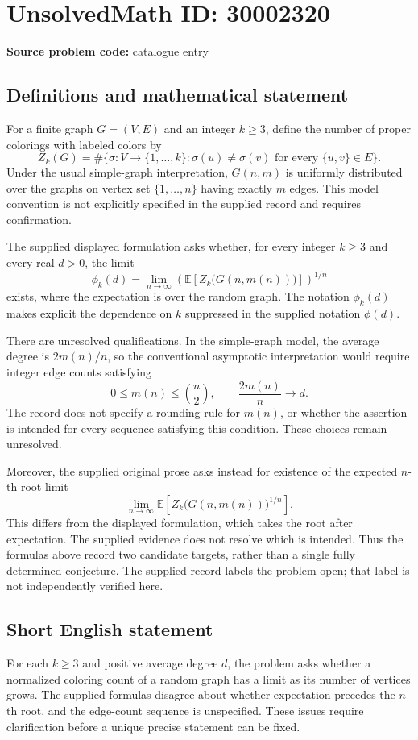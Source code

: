\documentclass[11pt]{article}
\begin{document}
\section*{UnsolvedMath ID: 30002320}
\textbf{Source problem code:} catalogue entry
\subsection{Definitions and mathematical statement}
For a finite graph \(G=(V,E)\) and an integer \(k\geq 3\), define the number of proper colorings with labeled colors by
\[
Z_k(G)=\#\bigl\{\sigma:V\to\{1,\ldots,k\}:\sigma(u)\neq\sigma(v)\text{ for every }\{u,v\}\in E\bigr\}.
\]
Under the usual simple-graph interpretation, \(G(n,m)\) is uniformly distributed over the graphs on vertex set \(\{1,\ldots,n\}\) having exactly \(m\) edges. This model convention is not explicitly specified in the supplied record and requires confirmation.

The supplied displayed formulation asks whether, for every integer \(k\geq3\) and every real \(d>0\), the limit
\[
\phi_k(d)=\lim_{n\to\infty}\left(\mathbb E\left[Z_k\bigl(G(n,m(n))\bigr)\right]\right)^{1/n}
\]
exists, where the expectation is over the random graph. The notation \(\phi_k(d)\) makes explicit the dependence on \(k\) suppressed in the supplied notation \(\phi(d)\).

There are unresolved qualifications. In the simple-graph model, the average degree is \(2m(n)/n\), so the conventional asymptotic interpretation would require integer edge counts satisfying
\[
0\leq m(n)\leq\binom n2,\qquad \frac{2m(n)}n\longrightarrow d.
\]
The record does not specify a rounding rule for \(m(n)\), or whether the assertion is intended for every sequence satisfying this condition. These choices remain unresolved.

Moreover, the supplied original prose asks instead for existence of the expected \(n\)-th-root limit
\[
\lim_{n\to\infty}\mathbb E\left[Z_k\bigl(G(n,m(n))\bigr)^{1/n}\right].
\]
This differs from the displayed formulation, which takes the root after expectation. The supplied evidence does not resolve which is intended. Thus the formulas above record two candidate targets, rather than a single fully determined conjecture. The supplied record labels the problem open; that label is not independently verified here.
\subsection{Short English statement}
For each \(k\geq3\) and positive average degree \(d\), the problem asks whether a normalized coloring count of a random graph has a limit as its number of vertices grows. The supplied formulas disagree about whether expectation precedes the \(n\)-th root, and the edge-count sequence is unspecified. These issues require clarification before a unique precise statement can be fixed.
\end{document}

